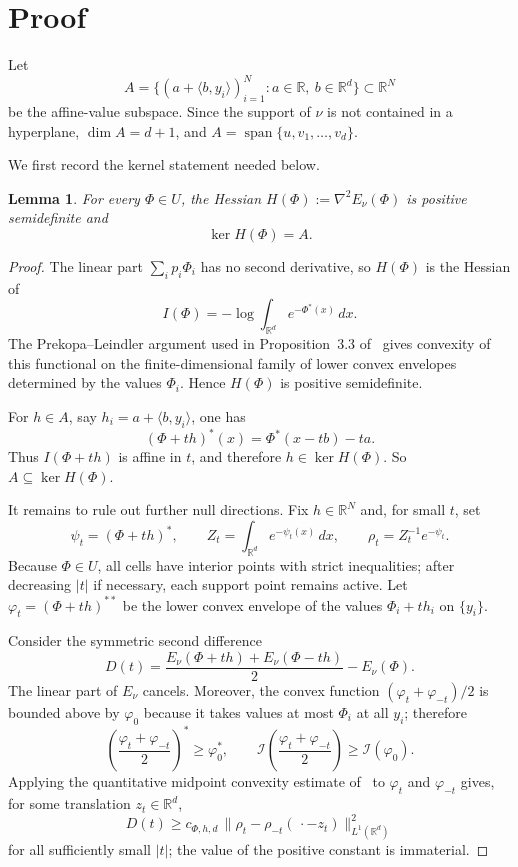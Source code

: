 \documentclass[11pt]{article}
\newtheorem{lemma}{Lemma}
\newcommand{\R}{\mathbb{R}}
\newcommand{\I}{\mathcal{I}}
\newcommand{\spanop}{\operatorname{span}}
\begin{document}
\section*{Proof}

Let
\[
A=\{(a+\langle b,y_i\rangle)_{i=1}^N:a\in\R,\ b\in\R^d\}\subset\R^N
\]
be the affine-value subspace.  Since the support of $\nu$ is not contained in a hyperplane, $\dim A=d+1$, and $A=\spanop\{u,v_1,\ldots,v_d\}$.

We first record the kernel statement needed below.

\begin{lemma}
\label{lem:kernel}
For every $\Phi\in U$, the Hessian $H(\Phi):=\nabla^2E_\nu(\Phi)$ is positive semidefinite and
\[
\ker H(\Phi)=A.
\]
\end{lemma}

\begin{proof}
The linear part $\sum_i p_i\Phi_i$ has no second derivative, so $H(\Phi)$ is the Hessian of
\[
I(\Phi)=-\log\int_{\R^d}e^{-\Phi^*(x)}\,dx.
\]
The Prekopa--Leindler argument used in Proposition~3.3 of~\cite{BR} gives convexity of this functional on the finite-dimensional family of lower convex envelopes determined by the values $\Phi_i$.  Hence $H(\Phi)$ is positive semidefinite.

For $h\in A$, say $h_i=a+\langle b,y_i\rangle$, one has
\[
(\Phi+t h)^*(x)=\Phi^*(x-tb)-ta.
\]
Thus $I(\Phi+t h)$ is affine in $t$, and therefore $h\in\ker H(\Phi)$.  So $A\subseteq\ker H(\Phi)$.

It remains to rule out further null directions.  Fix $h\in\R^N$ and, for small $t$, set
\[
\psi_t=(\Phi+t h)^*,\qquad
Z_t=\int_{\R^d}e^{-\psi_t(x)}\,dx,\qquad
\rho_t=Z_t^{-1}e^{-\psi_t}.
\]
Because $\Phi\in U$, all cells have interior points with strict inequalities; after decreasing $|t|$ if necessary, each support point remains active.  Let $\varphi_t=(\Phi+t h)^{**}$ be the lower convex envelope of the values $\Phi_i+t h_i$ on $\{y_i\}$.

Consider the symmetric second difference
\[
D(t)=\frac{E_\nu(\Phi+t h)+E_\nu(\Phi-t h)}2-E_\nu(\Phi).
\]
The linear part of $E_\nu$ cancels.  Moreover, the convex function $(\varphi_t+\varphi_{-t})/2$ is bounded above by $\varphi_0$ because it takes values at most $\Phi_i$ at all $y_i$; therefore
\[
\left(\frac{\varphi_t+\varphi_{-t}}2\right)^*\ge \varphi_0^*,
\qquad
\I\!\left(\frac{\varphi_t+\varphi_{-t}}2\right)\ge \I(\varphi_0).
\]
Applying the quantitative midpoint convexity estimate of~\cite[Proposition~3.3]{BR} to $\varphi_t$ and $\varphi_{-t}$ gives, for some translation $z_t\in\R^d$,
\[
D(t)\ge c_{\Phi,h,d}\,
\|\rho_t-\rho_{-t}(\,\cdot-z_t)\|_{L^1(\R^d)}^2
\]
for all sufficiently small $|t|$; the value of the positive constant is immaterial.


\end{proof}
\end{document}
